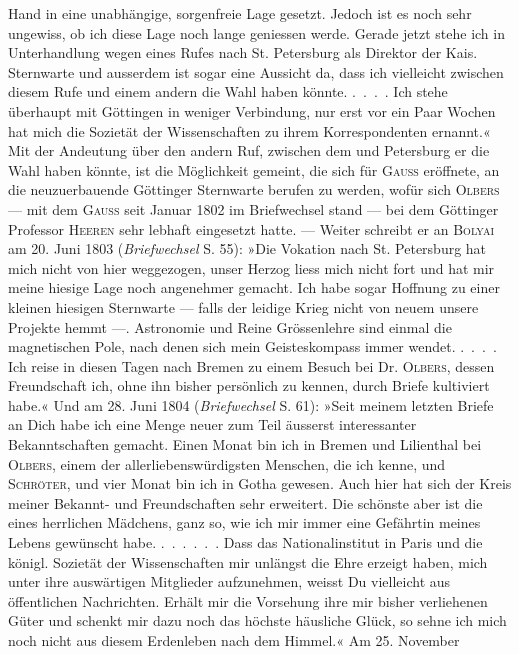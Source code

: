 \noindent Hand in eine unabhängige, sorgenfreie Lage gesetzt. Jedoch ist es noch sehr
ungewiss, ob ich diese Lage noch lange geniessen werde. Gerade jetzt stehe
ich in Unterhandlung wegen eines Rufes nach St. Petersburg als Direktor der
Kais. Sternwarte und ausserdem ist sogar eine Aussicht da, dass ich vielleicht
zwischen diesem Rufe und einem andern die Wahl haben könnte. .\ .\ .\ . Ich
stehe überhaupt mit Göttingen in weniger Verbindung, nur erst vor ein Paar
Wochen hat mich die Sozietät der Wissenschaften zu ihrem Korrespondenten
ernannt.« Mit der Andeutung über den andern Ruf, zwischen dem und Petersburg
er die Wahl haben könnte, ist die Möglichkeit gemeint, die sich
für \textsc{Gauss} eröffnete, an die neuzuerbauende Göttinger Sternwarte berufen zu
werden, wofür sich \textsc{Olbers} — mit dem \textsc{Gauss} seit Januar 1802 im Briefwechsel
stand — bei dem Göttinger Professor \textsc{Heeren} sehr lebhaft eingesetzt
hatte. — Weiter schreibt er an \textsc{Bolyai} am 20. Juni 1803 (\textit{Briefwechsel} S. 55):
»Die Vokation nach St. Petersburg hat mich nicht von hier weggezogen, unser
Herzog liess mich nicht fort und hat mir meine hiesige Lage noch angenehmer
gemacht. Ich habe sogar Hoffnung zu einer kleinen hiesigen Sternwarte
— falls der leidige Krieg nicht von neuem unsere Projekte hemmt —.
Astronomie und Reine Grössenlehre sind einmal die magnetischen Pole, nach
denen sich mein Geisteskompass immer wendet. .\ .\ .\ . Ich reise in diesen
Tagen nach Bremen zu einem Besuch bei Dr. \textsc{Olbers}, dessen Freundschaft
ich, ohne ihn bisher persönlich zu kennen, durch Briefe kultiviert habe.« Und
am 28. Juni 1804 (\textit{Briefwechsel} S. 61): »Seit meinem letzten Briefe an Dich
habe ich eine Menge neuer zum Teil äusserst interessanter Bekanntschaften gemacht.
Einen Monat bin ich in Bremen und Lilienthal bei \textsc{Olbers}, einem der
allerliebenswürdigsten Menschen, die ich kenne, und \textsc{Schröter}, und vier Monat
bin ich in Gotha gewesen. Auch hier hat sich der Kreis meiner Bekannt-
und Freundschaften sehr erweitert. Die schönste aber ist die eines herrlichen
Mädchens, ganz so, wie ich mir immer eine Gefährtin meines Lebens gewünscht
habe. .\ .\ .\ .\ .\ . Dass das Nationalinstitut in Paris und die königl.
Sozietät der Wissenschaften mir unlängst die Ehre erzeigt haben, mich unter
ihre auswärtigen Mitglieder aufzunehmen, weisst Du vielleicht aus öffentlichen
Nachrichten. Erhält mir die Vorsehung ihre mir bisher verliehenen Güter
und schenkt mir dazu noch das höchste häusliche Glück, so sehne ich mich
noch nicht aus diesem Erdenleben nach dem Himmel.« Am 25. November\par
